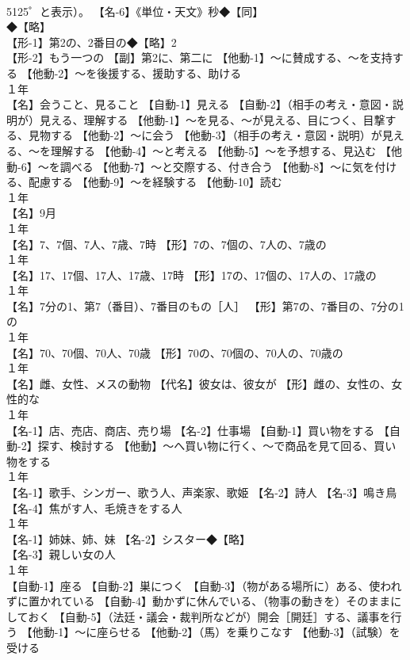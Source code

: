 \documentclass[8pt]{extreport}
\begin{document}
\begin{CJK}{UTF8}{min}
\\	5125゜と表示）。 【名-6】《単位・天文》秒◆【同】
\\	◆【略】
\\	【形-1】第2の、2番目の◆【略】2
\\	【形-2】もう一つの 【副】第2に、第二に 【他動-1】～に賛成する、～を支持する 【他動-2】～を後援する、援助する、助ける
\\	１年	
\\	【名】会うこと、見ること 【自動-1】見える 【自動-2】（相手の考え・意図・説明が）見える、理解する 【他動-1】～を見る、～が見える、目につく、目撃する、見物する 【他動-2】～に会う 【他動-3】（相手の考え・意図・説明）が見える、～を理解する 【他動-4】～と考える 【他動-5】～を予想する、見込む 【他動-6】～を調べる 【他動-7】～と交際する、付き合う 【他動-8】～に気を付ける、配慮する 【他動-9】～を経験する 【他動-10】読む
\\	１年	
\\	【名】9月
\\	１年	
\\	【名】7、7個、7人、7歳、7時 【形】7の、7個の、7人の、7歳の
\\	１年	
\\	【名】17、17個、17人、17歳、17時 【形】17の、17個の、17人の、17歳の
\\	１年	
\\	【名】7分の1、第7（番目）、7番目のもの［人］ 【形】第7の、7番目の、7分の1の
\\	１年	
\\	【名】70、70個、70人、70歳 【形】70の、70個の、70人の、70歳の
\\	１年	
\\	【名】雌、女性、メスの動物 【代名】彼女は、彼女が 【形】雌の、女性の、女性的な
\\	１年	
\\	【名-1】店、売店、商店、売り場 【名-2】仕事場 【自動-1】買い物をする 【自動-2】探す、検討する 【他動】～へ買い物に行く、～で商品を見て回る、買い物をする
\\	１年	
\\	【名-1】歌手、シンガー、歌う人、声楽家、歌姫 【名-2】詩人 【名-3】鳴き鳥 【名-4】焦がす人、毛焼きをする人
\\	１年	
\\	【名-1】姉妹、姉、妹 【名-2】シスター◆【略】
\\	【名-3】親しい女の人
\\	１年	
\\	【自動-1】座る 【自動-2】巣につく 【自動-3】（物がある場所に）ある、使われずに置かれている 【自動-4】動かずに休んでいる、（物事の動きを）そのままにしておく 【自動-5】（法廷・議会・裁判所などが）開会［開廷］する、議事を行う 【他動-1】～に座らせる 【他動-2】（馬）を乗りこなす 【他動-3】（試験）を受ける

\end{CJK}
\end{document}
